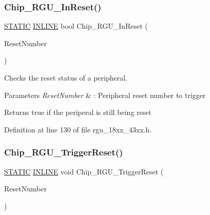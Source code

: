\subsubsection{\texorpdfstring{Chip\+\_\+\+R\+G\+U\+\_\+\+In\+Reset()}{Chip\_RGU\_InReset()}}
{\footnotesize\ttfamily \hyperlink{group___l_p_c___types___public___macros_ga10b2d890d871e1489bb02b7e70d9bdfb}{S\+T\+A\+T\+IC} \hyperlink{spifi__18xx__43xx_8h_a2eb6f9e0395b47b8d5e3eeae4fe0c116}{I\+N\+L\+I\+NE} bool Chip\+\_\+\+R\+G\+U\+\_\+\+In\+Reset (\begin{DoxyParamCaption}\item[{\hyperlink{group___r_g_u__18_x_x__43_x_x_gaf76b0dbb78e73bbcd44948364417ae60}{C\+H\+I\+P\+\_\+\+R\+G\+U\+\_\+\+R\+S\+T\+\_\+T}}]{Reset\+Number }\end{DoxyParamCaption})}



Checks the reset status of a peripheral. 


\begin{DoxyParams}{Parameters}
{\em Reset\+Number} & \+: Peripheral reset number to trigger \\
\hline
\end{DoxyParams}
\begin{DoxyReturn}{Returns}
true if the periperal is still being reset 
\end{DoxyReturn}


Definition at line 130 of file rgu\+\_\+18xx\+\_\+43xx.\+h.

\mbox{\label{group___r_g_u__18_x_x__43_x_x_ga3cc30f9a3adbdba9866e6a80cb9eb71d}} 
\subsubsection{\texorpdfstring{Chip\+\_\+\+R\+G\+U\+\_\+\+Trigger\+Reset()}{Chip\_RGU\_TriggerReset()}}
{\footnotesize\ttfamily \hyperlink{group___l_p_c___types___public___macros_ga10b2d890d871e1489bb02b7e70d9bdfb}{S\+T\+A\+T\+IC} \hyperlink{spifi__18xx__43xx_8h_a2eb6f9e0395b47b8d5e3eeae4fe0c116}{I\+N\+L\+I\+NE} void Chip\+\_\+\+R\+G\+U\+\_\+\+Trigger\+Reset (\begin{DoxyParamCaption}\item[{\hyperlink{group___r_g_u__18_x_x__43_x_x_gaf76b0dbb78e73bbcd44948364417ae60}{C\+H\+I\+P\+\_\+\+R\+G\+U\+\_\+\+R\+S\+T\+\_\+T}}]{Reset\+Number }\end{DoxyParamCaption})}



